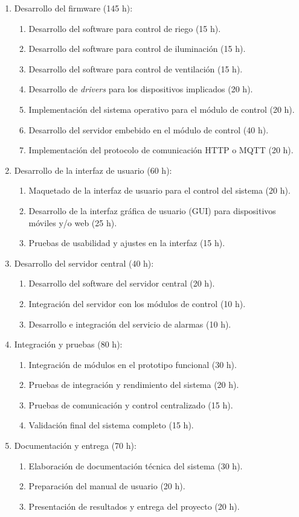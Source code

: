 \documentclass[
11pt, %
]{charter}
\begin{document}
\begin{enumerate}
\begin{enumerate}
	\end{enumerate}
\item Desarrollo del firmware (145 h):
	\begin{enumerate}
	\item Desarrollo del software para control de riego (15 h).
	\item Desarrollo del software para control de iluminación (15 h).
	\item Desarrollo del software para control de ventilación (15 h).
	\item Desarrollo de \textit{drivers} para los dispositivos implicados (20 h).
	\item Implementación del sistema operativo para el módulo de control (20 h).
	\item Desarrollo del servidor embebido en el módulo de control (40 h).
	\item Implementación del protocolo de comunicación HTTP o MQTT (20 h).
	\end{enumerate}
\item Desarrollo de la interfaz de usuario (60 h):
	\begin{enumerate}
	\item Maquetado de la interfaz de usuario para el control del sistema (20 h).
	\item Desarrollo de la interfaz gráfica de usuario (GUI) para dispositivos móviles y/o web (25 h).
	\item Pruebas de usabilidad y ajustes en la interfaz (15 h).
	\end{enumerate}
\item Desarrollo del servidor central (40 h):
	\begin{enumerate}
	\item Desarrollo del software del servidor central (20 h).
	\item Integración del servidor con los módulos de control (10 h).
	\item Desarrollo e integración del servicio de alarmas (10 h).
	\end{enumerate}
\item Integración y pruebas (80 h):
	\begin{enumerate}
	\item Integración de módulos en el prototipo funcional (30 h).
	\item Pruebas de integración y rendimiento del sistema (20 h).
	\item Pruebas de comunicación y control centralizado (15 h).
	\item Validación final del sistema completo (15 h).
	\end{enumerate}
\item Documentación y entrega (70 h):
	\begin{enumerate}
	\item Elaboración de documentación técnica del sistema (30 h).
	\item Preparación del manual de usuario (20 h).
	\item Presentación de resultados y entrega del proyecto (20 h).
	\end{enumerate}
\end{enumerate}
\end{document}
